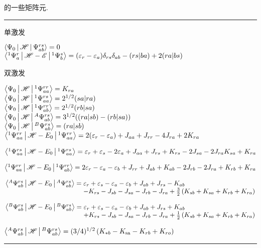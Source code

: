 \begin{table}[H]
		\caption{的一些矩阵元.}
		\hrule
		\vspace{5pt}
        单激发\par
        $\Braket{\Psi_0|\mathscr{H}|\Psi_{ab}^{rs}} = 0$\\
        $\Braket{^1\Psi_a^r|\mathscr{H}-\mathscr{E}|^1\Psi_b^s} = (\varepsilon_r-\varepsilon_a)\delta_{rs}\delta_{ab}-(rs|ba)+2(ra|bs)$
        \par
        \mbox{}\par
        双激发\par
        $\Braket{\Psi_0|\mathscr{H}|^1\Psi_{aa}^{rr}}  = K_{ra}$\\
        $\Braket{\Psi_0|\mathscr{H}|^1\Psi_{aa}^{rs}} = 2^{1/2}(sa|ra)$\\
        $\Braket{\Psi_0|\mathscr{H}|^1\Psi_{ab}^{rr}} = 2^{1/2}(rb|sa)$\\
        $\Braket{\Psi_0|\mathscr{H}|^A\Psi_{ab}^{rs}} = 3^{1/2}((ra|sb)-(rb|sa))$\\
        $\Braket{\Psi_0|\mathscr{H}|^B\Psi_{ab}^{rs}} = (ra|sb)$\\
        $\Braket{^1\Psi_{aa}^{rr}|\mathscr{H}-E_0|^1\Psi_{aa}^{rr}} = 2(\varepsilon_r-\varepsilon_a) + J_{aa} + J_{rr} -4J_{ra} + 2K_{ra}
        $\par
        $\Braket{^1\Psi_{aa}^{rs}|\mathscr{H}-E_0|^1\Psi_{aa}^{rs}} = \varepsilon_r+\varepsilon_s -2\varepsilon_{a}+ J_{aa} + J_{rs} +K_{rs} -2J_{sa} -2J_{ra} K_{sa} + K_{ra}
        $\par
        $\Braket{^1\Psi_{aa}^{rr}|\mathscr{H}-E_0|^1\Psi_{ab}^{rr}} = 2\varepsilon_r-\varepsilon_a -\varepsilon_{b}+ J_{rr} + J_{ab} +K_{ab} -2J_{rb} -2J_{ra} + K_{rb} + K_{ra}
        $\par
        $\arraycolsep=1.4pt\begin{array}[t]{ll}\braket{^A\Psi_{ab}^{rs}|\hs-E_0|^A\Psi_{ab}^{rs}} =& 
         \epsilon_{r}+\epsilon_{s}-\epsilon_{a}-\epsilon_{b}+J_{a b}+J_{r s}-K_{a b} \\
        &-K_{r s}-J_{s b}-J_{s a}-J_{r b}-J_{r a}+\frac{3}{2}\left(K_{s b}+K_{s a}+K_{r b}+K_{r a}\right)\end{array}$\par
        $\arraycolsep=1.4pt
        \begin{array}[t]{ll}\braket{^B\Psi_{ab}^{rs}|\hs-E_0|^B\Psi_{ab}^{rs}} = &\varepsilon_{r}+\varepsilon_{s}-\varepsilon_{a}-\varepsilon_{b}+J_{a b}+J_{r s}+K_{a b}\\
        &+K_{r s}-J_{s b}-J_{s a}-J_{r b}-J_{r a}+\frac{1}{2}\left(K_{s b}+K_{s a}+K_{r b}+K_{r a}\right)\end{array}$\par
        $\Braket{^A\Psi_{ab}^{rs}|\mathscr{H}|^B\Psi_{ab}^{rs}}=(3 / 4)^{1 / 2}\left(K_{* b}-K_{\mathrm{sa}}-K_{r b}+K_{r o}\right)$
        \vspace{5pt}
		\hrule
	\end{table}


